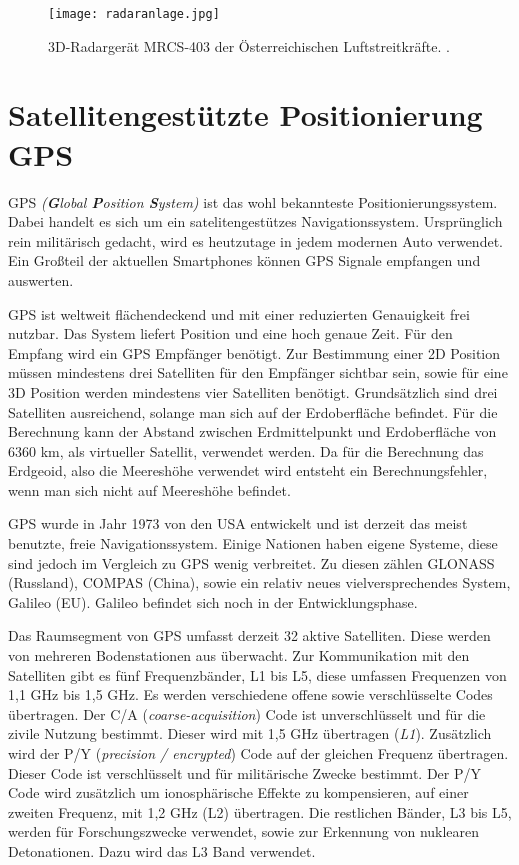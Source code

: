 \begin{figure}[H]
\centering
\texttt{[image: radaranlage.jpg]}
\caption{3D-Radargerät MRCS-403 der Österreichischen Luftstreitkräfte. \cite{ImgRadar}.}
\label{fig:RadarSystem}
\end{figure}

\section{Satellitengestützte Positionierung GPS}
GPS \emph{(\textbf{G}lobal \textbf{P}osition \textbf{S}ystem)} ist das wohl bekannteste Positionierungssystem. Dabei handelt es sich um ein satelitengestützes Navigationssystem. Ursprünglich rein militärisch gedacht, wird es heutzutage in jedem modernen Auto verwendet. Ein Großteil der aktuellen Smartphones können GPS Signale empfangen und auswerten. 

GPS ist weltweit flächendeckend und mit einer reduzierten Genauigkeit frei nutzbar. Das System liefert Position und eine hoch genaue Zeit. Für den Empfang wird ein GPS Empfänger benötigt. Zur Bestimmung einer 2D Position müssen mindestens drei Satelliten für den Empfänger sichtbar sein, sowie für eine 3D Position werden mindestens vier Satelliten benötigt. Grundsätzlich sind drei Satelliten ausreichend, solange man sich auf der Erdoberfläche befindet. Für die Berechnung kann der Abstand zwischen Erdmittelpunkt und Erdoberfläche von 6360 km, als virtueller Satellit, verwendet werden. Da für die Berechnung das Erdgeoid, also die Meereshöhe verwendet wird entsteht ein Berechnungsfehler, wenn man sich nicht auf Meereshöhe befindet.

GPS wurde in Jahr 1973 von den USA entwickelt und ist derzeit das meist benutzte, freie Navigationssystem. Einige Nationen haben eigene Systeme, diese sind jedoch im Vergleich zu GPS wenig verbreitet. Zu diesen zählen GLONASS (Russland), COMPAS (China), sowie ein relativ neues vielversprechendes System, Galileo (EU). Galileo befindet sich noch in der Entwicklungsphase. 

Das Raumsegment von GPS umfasst derzeit 32 aktive Satelliten. Diese werden von mehreren Bodenstationen aus überwacht. Zur Kommunikation mit den Satelliten gibt es fünf Frequenzbänder, L1 bis L5, diese umfassen Frequenzen von 1,1 GHz bis 1,5 GHz. Es werden verschiedene offene sowie verschlüsselte Codes übertragen. Der C/A (\emph{coarse-acquisition}) Code ist unverschlüsselt und für die zivile Nutzung bestimmt. Dieser wird mit 1,5 GHz übertragen (\emph{L1}). Zusätzlich wird der P/Y (\emph{precision / encrypted}) Code auf der gleichen Frequenz übertragen. Dieser Code ist verschlüsselt und für militärische Zwecke bestimmt. Der P/Y Code wird zusätzlich um ionosphärische Effekte zu kompensieren, auf einer zweiten Frequenz, mit 1,2 GHz (L2) übertragen. Die restlichen Bänder, L3 bis L5, werden für Forschungszwecke verwendet, sowie zur Erkennung von nuklearen Detonationen. Dazu wird das L3 Band verwendet. 

